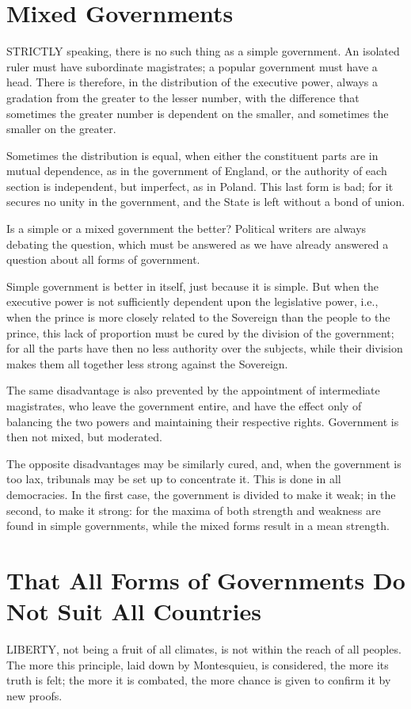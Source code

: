 \documentclass[12pt]{report}
\begin{document}
\section{Mixed Governments}
STRICTLY speaking, there is no such thing as a simple government. An isolated ruler must have subordinate magistrates; a popular government must have a head. There is therefore, in the distribution of the executive power, always a gradation from the greater to the lesser number, with the difference that sometimes the greater number is dependent on the smaller, and sometimes the smaller on the greater.

Sometimes the distribution is equal, when either the constituent parts are in mutual dependence, as in the government of England, or the authority of each section is independent, but imperfect, as in Poland. This last form is bad; for it secures no unity in the government, and the State is left without a bond of union.

Is a simple or a mixed government the better? Political writers are always debating the question, which must be answered as we have already answered a question about all forms of government.

Simple government is better in itself, just because it is simple. But when the executive power is not sufficiently dependent upon the legislative power, i.e., when the prince is more closely related to the Sovereign than the people to the prince, this lack of proportion must be cured by the division of the government; for all the parts have then no less authority over the subjects, while their division makes them all together less strong against the Sovereign.

The same disadvantage is also prevented by the appointment of intermediate magistrates, who leave the government entire, and have the effect only of balancing the two powers and maintaining their respective rights. Government is then not mixed, but moderated.

The opposite disadvantages may be similarly cured, and, when the government is too lax, tribunals may be set up to concentrate it. This is done in all democracies. In the first case, the government is divided to make it weak; in the second, to make it strong: for the maxima of both strength and weakness are found in simple governments, while the mixed forms result in a mean strength.

\section{That All Forms of Governments Do Not Suit All Countries}
LIBERTY, not being a fruit of all climates, is not within the reach of all peoples. The more this principle, laid down by Montesquieu, is considered, the more its truth is felt; the more it is combated, the more chance is given to confirm it by new proofs.
\end{document}
